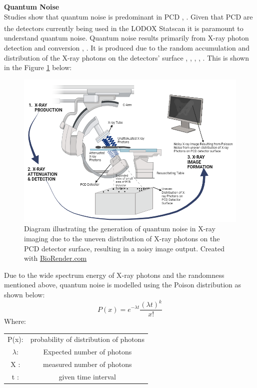 \textbf{Quantum Noise}\\
Studies show that quantum noise is predominant in \gls{PCD} \cite{noauthor_noise_nodate}, \cite{huda_radiographic_2015}. Given that \gls{PCD} are the detectors currently being used in the LODOX\textsuperscript{\textregistered} Statscan\textsuperscript{\textregistered} it is paramount to understand quantum noise. Quantum noise results primarily from X-ray photon detection and conversion \cite{kim_measurements_2024}, \cite{seibert_tradeoffs_2004}. It is produced due to the random accumulation and distribution of the X-ray photons on the detectors’ surface \cite{noauthor_noise_nodate}, \cite{veldkamp_dose_2009}, \cite{manson_image_2019}, \cite{chandra_analysis_2020}, \cite{juneja_denoising_2024}. This is shown in the Figure \ref{PoissonGen} below:
\begin{figure}[h!]
    \centering
    \includegraphics[width=0.5\linewidth]{3_Chapters//2_Chapter_LiteratureReview//Figures/PoissonNoise Prodcution.png}
    \caption{Diagram illustrating the generation of quantum noise in X-ray imaging due to the uneven distribution of X-ray photons on the PCD detector surface, resulting in a noisy image output. Created with \href{https://www.biorender.com}{BioRender.com}  }
    \label{PoissonGen}
\end{figure}

Due to the wide spectrum energy of X-ray photons and the randomness mentioned above, quantum noise is modelled using the Poison distribution as shown below:
\begin{equation}
P(x) = e^{-\lambda t} \frac{(\lambda t)^k}{x!}
\label{eq:poisson}
\end{equation}
Where:
\begin{table}[h!]
    \begin{tabular}{cc}
         P(x):& probability of distribution of photons \\
         $\lambda$:& Expected number of photons \\
         X :& measured number of photons\\
         t :& given time interval\\
    \end{tabular}
    
\end{table}

